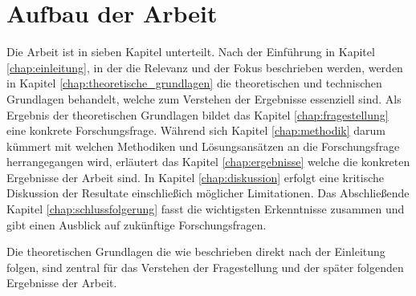 \section{Aufbau der Arbeit}
\label{sec:aufbau_der_arbeit} Die Arbeit ist in sieben Kapitel unterteilt. Nach
der Einführung in Kapitel \ref{chap:einleitung}, in der die Relevanz und der Fokus
beschrieben werden, werden in Kapitel \ref{chap:theoretische_grundlagen} die
theoretischen und technischen Grundlagen behandelt, welche zum Verstehen der Ergebnisse
essenziell sind. Als Ergebnis der theoretischen Grundlagen bildet das Kapitel
\ref{chap:fragestellung} eine konkrete Forschungsfrage. Während sich Kapitel \ref{chap:methodik}
darum kümmert mit welchen Methodiken und Lösungsansätzen an die Forschungsfrage herrangegangen
wird, erläutert das Kapitel \ref{chap:ergebnisse} welche die konkreten
Ergebnisse der Arbeit sind. In Kapitel \ref{chap:diskussion} erfolgt eine kritische
Diskussion der Resultate einschließich möglicher Limitationen. Das Abschließende
Kapitel \ref{chap:schlussfolgerung} fasst die wichtigsten Erkenntnisse zusammen
und gibt einen Ausblick auf zukünftige Forschungsfragen.

Die theoretischen Grundlagen die wie beschrieben direkt nach der Einleitung
folgen, sind zentral für das Verstehen der Fragestellung und der später folgenden
Ergebnisse der Arbeit.
